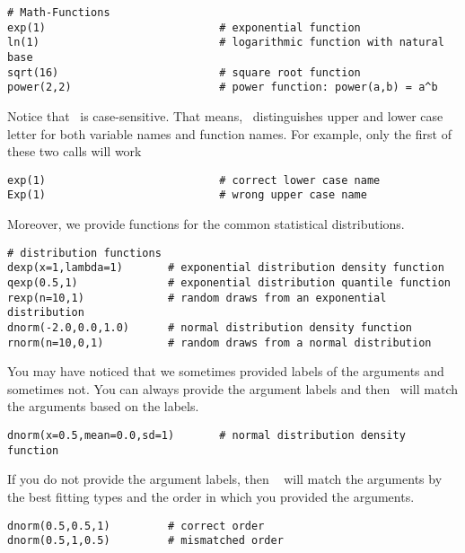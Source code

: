 {\tt \begin{snugshade*}
\begin{lstlisting}    
# Math-Functions
exp(1)                           # exponential function
ln(1)                            # logarithmic function with natural base
sqrt(16)                         # square root function 
power(2,2)                       # power function: power(a,b) = a^b
\end{lstlisting}
\end{snugshade*}}
Notice that \Rev~is case-sensitive. That means, \Rev~distinguishes upper and lower case letter for both variable names and function names. For example, only the first of these two calls will work
{\tt \begin{snugshade*}
\begin{lstlisting}    
exp(1)                           # correct lower case name
Exp(1)                           # wrong upper case name
\end{lstlisting}
\end{snugshade*}}
Moreover, we provide functions for the common statistical distributions.
{\tt \begin{snugshade*}
\begin{lstlisting}    
# distribution functions
dexp(x=1,lambda=1)       # exponential distribution density function
qexp(0.5,1)              # exponential distribution quantile function
rexp(n=10,1)             # random draws from an exponential distribution
dnorm(-2.0,0.0,1.0)      # normal distribution density function
rnorm(n=10,0,1)          # random draws from a normal distribution
\end{lstlisting}
\end{snugshade*}}
You may have noticed that we sometimes provided labels of the arguments and sometimes not. 
You can always provide the argument labels and then \RevBayes~will match the arguments based on the labels.
{\tt \begin{snugshade*}
\begin{lstlisting}    
dnorm(x=0.5,mean=0.0,sd=1)       # normal distribution density function
\end{lstlisting}
\end{snugshade*}}
If you do not provide the argument labels, then \RevBayes~ will match the arguments by the best fitting types and the order in which you provided the arguments.
{\tt \begin{snugshade*}
\begin{lstlisting}    
dnorm(0.5,0.5,1)         # correct order
dnorm(0.5,1,0.5)         # mismatched order
\end{lstlisting}
\end{snugshade*}}
